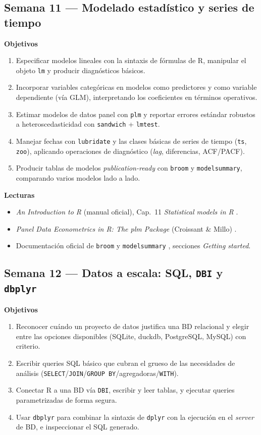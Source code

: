 \documentclass[11pt,letterpaper]{article}
\newcommand{\semanaSucinta}[2]{%
  \subsection*{\color{main}Semana #1 --- #2}%
}
\begin{document}
\semanaSucinta{11}{Modelado estadístico y series de tiempo}

\noindent\textbf{Objetivos}
\begin{enumerate}[leftmargin=*, itemsep=1pt]
    \item Especificar modelos lineales con la sintaxis de fórmulas de R, manipular el objeto \texttt{lm} y producir diagnósticos básicos.
    \item Incorporar variables categóricas en modelos como predictores y como variable dependiente (vía GLM), interpretando los coeficientes en términos operativos.
    \item Estimar modelos de datos panel con \texttt{plm} y reportar errores estándar robustos a heteroscedasticidad con \texttt{sandwich} + \texttt{lmtest}.
    \item Manejar fechas con \texttt{lubridate} y las clases básicas de series de tiempo (\texttt{ts}, \texttt{zoo}), aplicando operaciones de diagnóstico (\textit{lag}, diferencias, ACF/PACF).
    \item Producir tablas de modelos \textit{publication-ready} con \texttt{broom} y \texttt{modelsummary}, comparando varios modelos lado a lado.
\end{enumerate}

\noindent\textbf{Lecturas}
\begin{itemize}[leftmargin=*, itemsep=1pt]
    \item \textit{An Introduction to R} (manual oficial), Cap.\ 11 \textit{Statistical models in R} \cite{rcoreteam-intro}.
    \item \textit{Panel Data Econometrics in R: The plm Package} (Croissant \& Millo) \cite{croissant-plm}.
    \item Documentación oficial de \texttt{broom} \cite{robinson-broom} y \texttt{modelsummary} \cite{arelbundock-modelsummary}, secciones \textit{Getting started}.
\end{itemize}

\semanaSucinta{12}{Datos a escala: SQL, \texttt{DBI} y \texttt{dbplyr}}

\noindent\textbf{Objetivos}
\begin{enumerate}[leftmargin=*, itemsep=1pt]
    \item Reconocer cuándo un proyecto de datos justifica una BD relacional y elegir entre las opciones disponibles (SQLite, duckdb, PostgreSQL, MySQL) con criterio.
    \item Escribir queries SQL básico que cubran el grueso de las necesidades de análisis (\texttt{SELECT}/\texttt{JOIN}/\texttt{GROUP BY}/agregadoras/\texttt{WITH}).
    \item Conectar R a una BD vía \texttt{DBI}, escribir y leer tablas, y ejecutar queries parametrizadas de forma segura.
    \item Usar \texttt{dbplyr} para combinar la sintaxis de \texttt{dplyr} con la ejecución en el \textit{server} de BD, e inspeccionar el SQL generado.
\end{enumerate}
\end{document}
